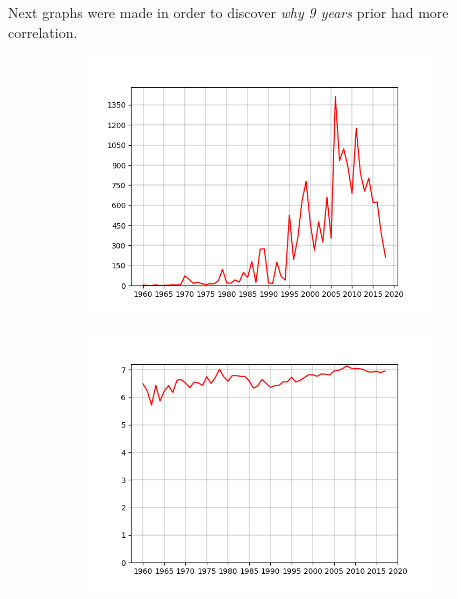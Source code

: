 \begin{frame}
Next graphs were made in order to discover \emph{why} \textit{9 years} prior had more correlation. 
\begin{figure}
	\centering
	\begin{subfigure}{.4\columnwidth}
		\centering
		\includegraphics[width=\columnwidth]{graphics/avgFavorites.png}
	\end{subfigure}%
	\begin{subfigure}{.4\columnwidth}
		\centering
		\includegraphics[width=\columnwidth]{graphics/avgScores.png}
	\end{subfigure}
	\begin{subfigure}{.4\columnwidth}
		\centering

\end{subfigure}
\end{figure}
\end{frame}
